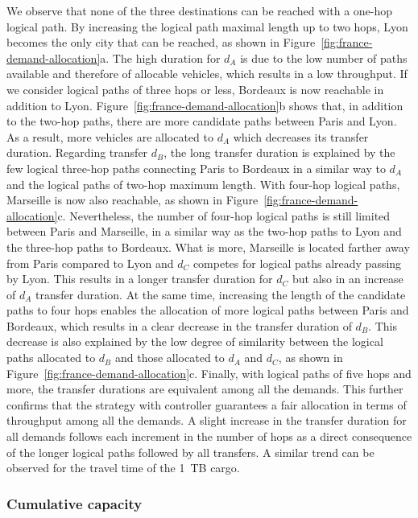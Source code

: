 We observe that none of the three destinations can be reached with a one-hop logical path. By increasing the logical path maximal length up to two hops, Lyon becomes the only city that can be reached, as shown in Figure~\ref{fig:france-demand-allocation}a. The high duration for $d_A$ is due to the low number of paths available and therefore of allocable vehicles, which results in a low throughput. If we consider logical paths of three hops or less, Bordeaux is now reachable in addition to Lyon. Figure~\ref{fig:france-demand-allocation}b shows that, in addition to the two-hop paths, there are more candidate paths between Paris and Lyon. As a result, more vehicles are allocated to $d_A$ which decreases its transfer duration. Regarding transfer $d_B$, the long transfer duration is explained by the few logical three-hop paths connecting Paris to Bordeaux in a similar way to $d_A$ and the logical paths of two-hop maximum length. With four-hop logical paths, Marseille is now also reachable, as shown in Figure~\ref{fig:france-demand-allocation}c. Nevertheless, the number of four-hop logical paths is still limited between Paris and Marseille, in a similar way as the two-hop paths to Lyon and the three-hop paths to Bordeaux. What is more, Marseille is located farther away from Paris compared to Lyon and $d_C$ competes for logical paths already passing by Lyon. This results in a longer transfer duration for $d_C$ but also in an increase of $d_A$ transfer duration.  At the same time, increasing the length of the candidate paths to four hops enables the allocation of more logical paths between Paris and Bordeaux, which results in a clear decrease in the transfer duration of $d_B$. This decrease is also explained by the low degree of similarity between the logical paths allocated to $d_B$ and those allocated to $d_A$ and $d_C$, as shown in Figure~\ref{fig:france-demand-allocation}c. Finally, with logical paths of five hops and more, the transfer durations are equivalent among all the demands. This further confirms that the strategy with controller guarantees a fair allocation in terms of throughput among all the demands. A slight increase in the transfer duration for all demands follows each increment in the number of hops as a direct consequence of the longer logical paths followed by all transfers. A similar trend can be observed for the travel time of the 1~TB cargo. 

\clearpage
\subsubsection{Cumulative capacity} 

